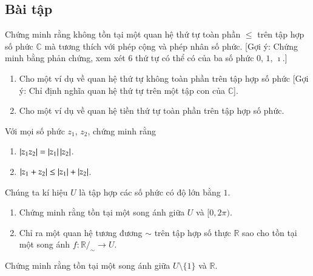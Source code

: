 \subsection{Bài tập}

\begin{exercise}
	Chứng minh rằng không tồn tại một quan hệ thứ tự toàn phần $\leq$ trên tập hợp số phức $\mathbb{C}$ mà tương thích với phép cộng và phép nhân số phức. [Gợi ý: Chứng minh bằng phản chứng, xem xét 6 thứ tự có thể có của ba số phức $0$, $1$, $\imath$.]
\end{exercise}

\begin{exercise}
    \begin{enumerate}[label={(\roman*)}]
        \item Cho một ví dụ về quan hệ thứ tự không toàn phần trên tập hợp số phức [Gợi ý: Chỉ định nghĩa quan hệ thứ tự trên một tập con của $\mathbb{C}$].
        \item Cho một ví dụ về quan hệ tiền thứ tự toàn phần trên tập hợp số phức.
    \end{enumerate}
\end{exercise}

\begin{exercise}
	Với mọi số phức $z_{1}$, $z_{2}$, chứng minh rằng
	\begin{enumerate}[label={(\roman*)}]
		\item $\left\vert{z_{1}z_{2}}\right\vert = \left\vert{z_{1}}\right\vert\left\vert{z_{2}}\right\vert$.
		\item $\left\vert{z_{1} + z_{2}}\right\vert\leq \left\vert{z_{1}}\right\vert + \left\vert{z_{2}}\right\vert$.
	\end{enumerate}
\end{exercise}

\begin{exercise}
	Chúng ta kí hiệu $U$ là tập hợp các số phức có độ lớn bằng $1$.
	\begin{enumerate}[label={(\roman*)}]
		\item Chứng minh rằng tồn tại một song ánh giữa $U$ và $[0, 2\pi)$.
		\item Chỉ ra một quan hệ tương đương $\sim$ trên tập hợp số thực $\mathbb{R}$ sao cho tồn tại một song ánh $f: \mathbb{R}/_{\sim} \to U$.
	\end{enumerate}
\end{exercise}

\begin{exercise}
    Chứng minh rằng tồn tại một song ánh giữa $U\setminus\{ 1 \}$ và $\mathbb{R}$.
\end{exercise}

